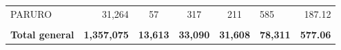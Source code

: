 \begin{tabular}{lrccclr}
	\cellcolor[HTML]{C6E0B4}PARURO                                 & 31,264                                                         & 57                                                          & 317                  & 211                      & 585                                                                 & 187.12                                                                       \\
	& \multicolumn{1}{l}{}                                           & \multicolumn{1}{l}{}                                        & \multicolumn{1}{l}{} & \multicolumn{1}{l}{}     &                                                                     & \multicolumn{1}{l}{}                                                         \\
	\rowcolor[HTML]{DDEBF7} 
	\textbf{Total   general}                                       & \textbf{1,357,075}                                             & \multicolumn{1}{r}{\cellcolor[HTML]{DDEBF7}\textbf{13,613}} & \textbf{33,090}      & \textbf{31,608}          & \textbf{78,311}                                                     & \textbf{577.06}                                                             
\end{tabular}